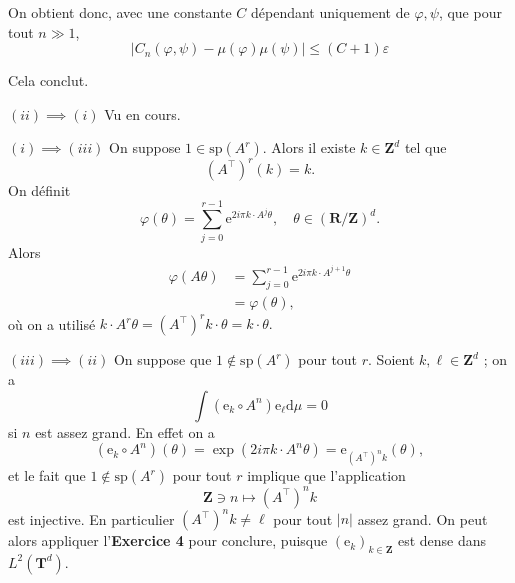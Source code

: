 \documentclass[a4paper,12pt,openany]{article}
\theoremstyle{plain}
\theoremstyle{definition}
\newcommand{\e}{\mathrm{e}}
\newcommand{\dd}{\mathrm{d}}
\newcommand{\T}{\mathbf{T}}
\newcommand{\R}{\mathbf{R}}
\newcommand{\Z}{\mathbf{Z}}
\begin{document}
On obtient donc, avec une constante $C$ d\'ependant uniquement de $\varphi, \psi$, que pour tout $n \gg 1$,
$$
|C_n(\varphi, \psi) - \mu(\varphi) \mu(\psi)| \leqslant (C + 1) \varepsilon
$$

Cela conclut.

\vspace{0.6cm}

 \vspace{1.5mm} 

\noindent
\underline{$(ii) \implies (i)$} Vu en cours.  
\vspace{0.3cm}

\noindent
\underline{$(i) \implies (iii)$} On suppose $1 \in \mathrm{sp}(A^r)$. Alors il existe $k \in \Z^d$ tel que 
$$\left({A^{\top}}\right)^r(k) = k.$$ 
 On d\'efinit
$$
\varphi(\theta) = \sum_{j=0}^{r-1} \e^{2i\pi k \cdot A^j\theta}, \quad \theta \in (\R/\Z)^d.
$$
 Alors
$$
\begin{aligned}
\varphi(A\theta) &= \sum_{j=0}^{r-1}\e^{2i \pi k \cdot A^{j+1}\theta}  \\
&= \varphi(\theta),
\end{aligned}
$$
o\`u on a utilis\'e $k \cdot A^r \theta = \left(A^\top\right)^r k \cdot \theta = k \cdot \theta.$

\vspace{0.3cm}
\noindent
\underline{$(iii) \implies (ii)$} On suppose que $1 \notin \mathrm{sp}(A^r)$ pour tout $r$.   Soient $k, \ell \in \Z^d$ ; on a 
$$
\int (\e_k \circ A^n) \e_\ell \dd \mu = 0
$$
si $n$ est assez grand.  En effet on a
$$(\e_k \circ A^n)(\theta) = \exp(2i\pi k \cdot A^n\theta) = \e_{\left(A^\top\right)^{n} k}(\theta),$$
et le fait que $1 \notin \mathrm{sp}(A^r)$ pour tout $r$ implique que l'application
$$
\Z \ni n \longmapsto \left(A^\top\right)^n k
$$
est injective.  En particulier $\left(A^\top\right)^nk \neq \ell$ pour tout $|n|$ assez grand.  
On peut alors appliquer l'\textbf{Exercice 4} pour conclure, puisque $(\e_k)_{k \in \Z}$ est dense dans $L^2(\T^d).$

\vspace{0.6cm}

 \vspace{1.5mm} 
\end{document}
